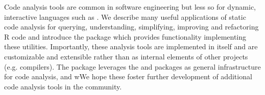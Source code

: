 Code analysis tools are common in software engineering but less so for dynamic, interactive
languages such as \R.  We describe many useful applications of static code analysis for querying,
understanding, simplifying, improving and refactoring R code and introduce the \R package
 which provides functionality implementing these utilities.  Importantly, these
analysis tools are implemented in \R itself and are customizable and extensible rather than as
internal elements of other projects (e.g. compilers).  The package leverages the  and
 packages as general infrastructure for code analysis, and wWe hope these foster
further development of additional code analysis tools in the \R community.


